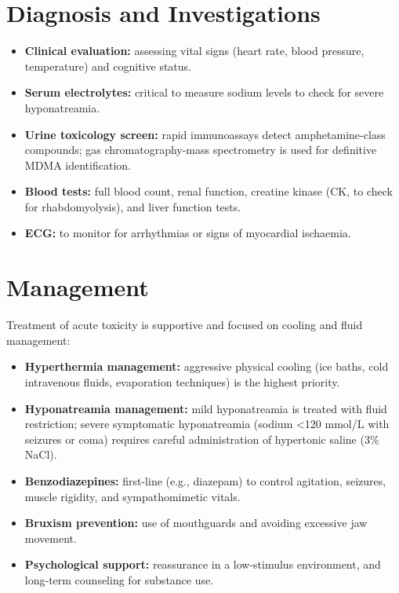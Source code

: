 \section*{Diagnosis and Investigations}
\begin{itemize}
    \item \textbf{Clinical evaluation:} assessing vital signs (heart rate, blood pressure, temperature) and cognitive status.
    \item \textbf{Serum electrolytes:} critical to measure sodium levels to check for severe hyponatreamia.
    \item \textbf{Urine toxicology screen:} rapid immunoassays detect amphetamine-class compounds; gas chromatography-mass spectrometry is used for definitive MDMA identification.
    \item \textbf{Blood tests:} full blood count, renal function, creatine kinase (CK, to check for rhabdomyolysis), and liver function tests.
    \item \textbf{ECG:} to monitor for arrhythmias or signs of myocardial ischaemia.
\end{itemize}

\section*{Management}
Treatment of acute toxicity is supportive and focused on cooling and fluid management:

\begin{itemize}
    \item \textbf{Hyperthermia management:} aggressive physical cooling (ice baths, cold intravenous fluids, evaporation techniques) is the highest priority.
    \item \textbf{Hyponatreamia management:} mild hyponatreamia is treated with fluid restriction; severe symptomatic hyponatreamia (sodium \textless{}120 mmol/L with seizures or coma) requires careful administration of hypertonic saline (3\% NaCl).
    \item \textbf{Benzodiazepines:} first-line (e.g., diazepam) to control agitation, seizures, muscle rigidity, and sympathomimetic vitals.
    \item \textbf{Bruxism prevention:} use of mouthguards and avoiding excessive jaw movement.
    \item \textbf{Psychological support:} reassurance in a low-stimulus environment, and long-term counseling for substance use.
\end{itemize}

